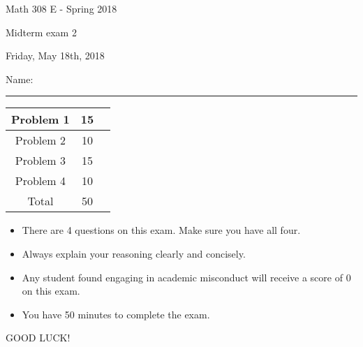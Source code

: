 \documentclass[12 pt]{report}
\begin{document}
\noindent \vfill \noindent \large

\centerline{Math 308 E - Spring 2018}

\centerline{Midterm exam 2}

\centerline{Friday, May 18th, 2018}

\normalsize

\vfill
\medskip
Name: \rule{10cm}{1pt}

\bigskip

\vfill
\begin{center}
{\large
\begin{tabular}{||c|c|r||}
\hline Problem 1 & 15 & \hspace{10mm} \hfill \\
\hline Problem 2 & 10 & \hspace{10mm} \hfill \\
\hline Problem 3 & 15 & \hspace{10mm} \hfill \\
\hline Problem 4 & 10 & \hspace{10mm} \hfill \\
\hline Total & 50 & \hspace{10mm} \hfill \\
\hline
\end{tabular}
}
\end{center}
\vfill
\begin{itemize}
\item There are 4 questions on this exam. Make sure you have all four.
\item Always explain your reasoning clearly and concisely. 
\item Any student found engaging in academic misconduct will receive
a score of 0 on this exam.
\item You have 50 minutes to complete the exam. \\
\end{itemize}
\vfill
\begin{center}GOOD LUCK!\end{center}

\newpage
\end{document}
